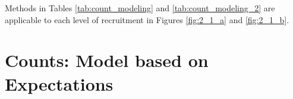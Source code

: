 \begin{table}[h!]
\centering
{}
\caption{Moments and aleatory and epistemic uncertainty of recruitment in one unit of time recruitment covered by different models for counts.}
\label{tab:count_modeling}
\end{table}




\begin{table}[h!]
\centering
{}
\caption{Moments and aleatory and epistemic uncertainty in accrual until $t$ covered by different models for counts.}
\label{tab:count_modeling_2}
\end{table}

Methods in Tables \ref{tab:count_modeling} and \ref{tab:count_modeling_2} are applicable to each level of recruitment in Figures \ref{fig:2_1_a} and \ref{fig:2_1_b}.


\section{Counts: Model based on Expectations}
\label{sec:expect}

